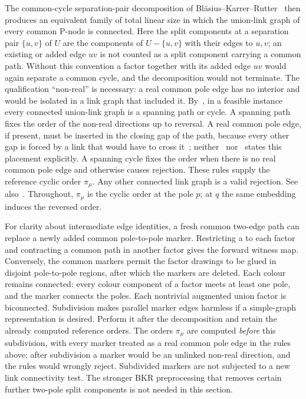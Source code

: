 The common-cycle separation-pair decomposition of
Bl\"asius--Karrer--Rutter~\cite[Lemma~4 and Theorem~2]{bkr} then produces
an equivalent family of total linear size in which the union-link graph of
every common P-node is connected.  Here the split components at a
separation pair $\{u,v\}$ of $U$ are the components of $U-\{u,v\}$ with
their edges to $u,v$; an existing or added edge $uv$ is not counted as a
split component carrying a common path.  Without this convention a factor
together with its added edge $uv$ would again separate a common cycle, and
the decomposition would not terminate.  The qualification ``non-real'' is
necessary: a real common pole edge has no interior and would be isolated in
a link graph that included it.  By~\cite[Lemma~3]{bkr}, in a feasible
instance every connected union-link graph is a spanning path or cycle.  A
spanning path fixes the order of the non-real directions up to reversal.
A real common pole edge, if present, must be inserted in the closing gap
of the path, because every other gap is forced by a link that would have
to cross it~\cite[Lemma~2]{bkr}; neither~\cite{bkr} nor~\cite{fpr} states
this placement explicitly.  A spanning cycle fixes the order when there is
no real common pole edge and otherwise causes rejection.  These rules
supply the reference cyclic order $\pi_\mu$.  Any other connected link
graph is a valid rejection.  See also~\cite[Lemma~4(c)]{fpr}.
Throughout, $\pi_\mu$ is the cyclic order at the pole $p$; at $q$ the same
embedding induces the reversed order.

For clarity about intermediate edge identities, a fresh common two-edge
path can replace a newly added common pole-to-pole marker.  Restricting a
\SEFE{} to each factor and contracting a common path in another factor gives
the forward witness map.  Conversely, the common markers permit the factor
drawings to be glued in disjoint pole-to-pole regions, after which the
markers are deleted.  Each colour remains connected: every colour component
of a factor meets at least one pole, and the marker connects the poles.
Each nontrivial augmented union factor is biconnected.  Subdivision makes
parallel marker edges harmless if a simple-graph representation is desired.
Perform it after the decomposition and retain the already computed
reference orders.  The orders $\pi_\mu$ are computed \emph{before} this
subdivision, with every marker treated as a real common pole edge in the
rules above; after subdivision a marker would be an unlinked non-real
direction, and the rules would wrongly reject.  Subdivided markers are not
subjected to a new link connectivity test.
The stronger BKR preprocessing that removes certain further two-pole split
components is not needed in this section.

